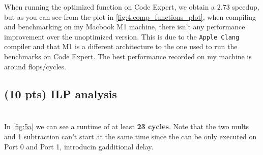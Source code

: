 \documentclass[tikz,14pt,fleqn]{article}
\begin{document}
When running the optimized function on Code Expert, we obtain a $2.73$ speedup, but as you can see from the plot in \autoref{fig:4.comp_functions_plot}, when compiling and benchmarking on my Macbook M1 machine, there isn't any performance improvement over the unoptimized version. This is due to the \texttt{Apple Clang} compiler and that M1 is a different architecture to the one used to run the benchmarks on Code Expert. The best performance recorded on my machine is around  flops/cycles.



\subsection{(10 pts) ILP analysis}
\begin{figure}[h!]
    \centering
    \vspace*{-0.7cm}
    \inputminted[fontsize=\scriptsize, bgcolor=CODEBG]{C}{../ex5/artcomp.c}
    \vspace{-1cm}
\end{figure}
\subsubsection{} %
In \autoref{fig:5a} we can see a runtime of at least \textbf{23 cycles}. Note that the two mults and 1 subtraction can't start at the same time since the can be only executed on Port 0 and Port 1, introducin gadditional delay.
\end{document}
